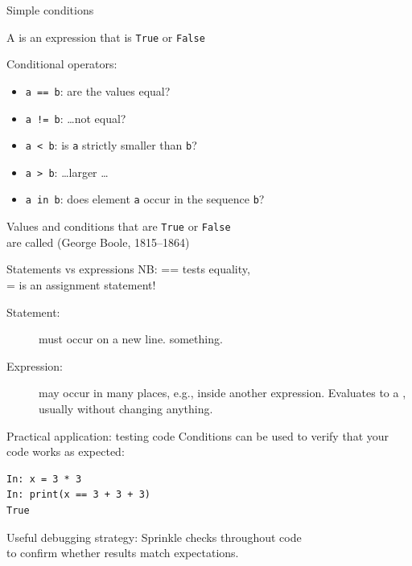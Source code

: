 \documentclass[aspectratio=169,usenames,dvipsnames]{beamer}
\begin{document}
\begin{frame}{Simple conditions}
    \begin{definition}
        A  is
        an expression that is \lstinline{True} or \lstinline{False}
    \end{definition}
    Conditional operators:
    \begin{itemize}
        \item \lstinline{a == b}: are the values equal?
        \item \lstinline{a != b}: \dots not equal?
        \item \lstinline{a < b}: is \lstinline{a}
                strictly smaller than \lstinline{b}?
        \item \lstinline{a > b}: \dots larger \dots
        \item \lstinline{a in b}: does element \lstinline{a} occur
                in the sequence \lstinline{b}?
    \end{itemize}

    Values and conditions that are \lstinline{True} or \lstinline{False} \\
    are called  (George Boole, 1815--1864)
\end{frame}

\begin{frame}{Statements vs expressions}
    NB: == tests equality, \\
           = is an assignment statement!

    \vspace{1em}
    \begin{description}
        \item[Statement:] must occur on a new line.  something.
        \item[Expression:] may occur in many places, e.g., inside another expression.
            Evaluates to a , usually without changing anything.
    \end{description}
\end{frame}

\begin{frame}[fragile]{Practical application: testing code}
Conditions can be used to verify that your code works as expected:
\begin{lstlisting}
In: x = 3 * 3
In: print(x == 3 + 3 + 3)
True
\end{lstlisting}

\begin{block}{Useful debugging strategy:}
Sprinkle checks throughout code \\
to confirm whether results match expectations.
\end{block}
\end{frame}
\end{document}
